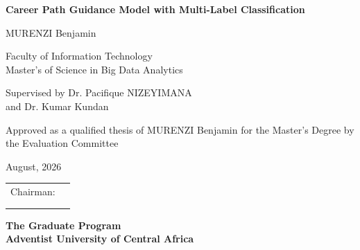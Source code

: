 \begin{titlepage}
    \begin{center}
        \textbf{\huge Career Path Guidance Model with Multi-Label Classification \newline}  
		
        \textnormal{\Large MURENZI Benjamin}
        
        
        \textnormal{\large Faculty of Information Technology\\ Master's of Science in Big Data Analytics}
        
        \textnormal{\large Supervised by Dr. Pacifique NIZEYIMANA \\ and Dr. Kumar Kundan}
        
        \textnormal{\large Approved as a qualified thesis of MURENZI Benjamin \newline }
        \textnormal{\large for the Master's Degree by the Evaluation Committee \newline}
        
        \textnormal{\large August, 2026}
        
        \begin{flushright}
        	\begin{tabular}{cl}
            \textnormal{Chairman}:	    & \underline{\makebox[2in][l]{}}\\ 
             							& \underline{\makebox[2in][l]{}}\\  
             							& \underline{\makebox[2in][l]{}}\\  
            							
                                       
                                                                                
            \end{tabular}
        \end{flushright}
        \vfill 
        
       \textbf{\Large The Graduate Program \\ Adventist University of Central Africa}
        \vfill               
    \end{center}
\end{titlepage}